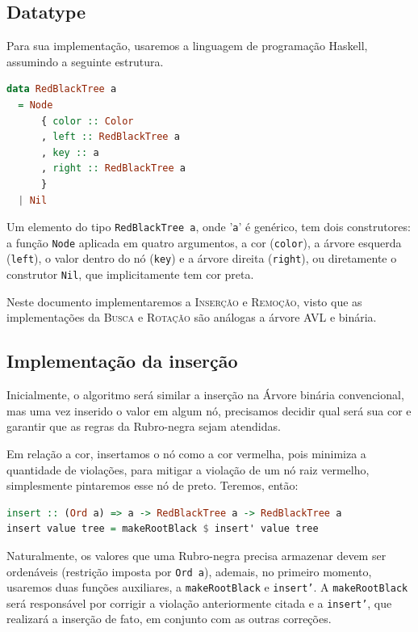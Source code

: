 \subsection{Datatype}

Para sua implementação, usaremos a linguagem de programação Haskell, assumindo a seguinte estrutura.

\begin{lstlisting}[language=haskell, caption={Árvore Rubro-Negra}]
data RedBlackTree a
  = Node
      { color :: Color
      , left :: RedBlackTree a
      , key :: a
      , right :: RedBlackTree a
      }
  | Nil
\end{lstlisting}

Um elemento do tipo \texttt{RedBlackTree a}, onde '\texttt{a}' é genérico, tem dois construtores: a função \texttt{Node} aplicada em quatro argumentos, a cor (\texttt{color}), a árvore esquerda (\texttt{left}), o valor dentro do nó (\texttt{key}) e a árvore direita (\texttt{right}), ou  diretamente o construtor \texttt{Nil}, que implicitamente tem cor preta.

Neste documento implementaremos a \textrm{I\textsc{nserção}} e \textrm{R\textsc{emoção}}, visto que as implementações da \textrm{B\textsc{usca}} e \textrm{R\textsc{otação}} são análogas a árvore AVL e binária.

\subsection{Implementação da inserção}

Inicialmente, o algoritmo será similar a inserção na Árvore binária convencional, mas uma vez inserido o valor em algum nó, precisamos decidir qual será sua cor e garantir que as regras da Rubro-negra sejam atendidas.

Em relação a cor, insertamos o nó como a cor vermelha, pois minimiza a quantidade de violações, para mitigar a violação de um nó raiz vermelho, simplesmente pintaremos esse nó de preto. Teremos, então:

\begin{lstlisting}[language=haskell, caption={Função principal}]
insert :: (Ord a) => a -> RedBlackTree a -> RedBlackTree a
insert value tree = makeRootBlack $ insert' value tree
\end{lstlisting}
\FloatBarrier

Naturalmente, os valores que uma Rubro-negra precisa armazenar devem ser ordenáveis (restrição imposta por \texttt{Ord a}), ademais, no primeiro momento, usaremos duas funções auxiliares, a \texttt{makeRootBlack} e \texttt{insert'}. A \texttt{makeRootBlack} será responsável por corrigir a violação anteriormente citada e a \texttt{insert'}, que realizará a inserção de fato, em conjunto com as outras correções.

